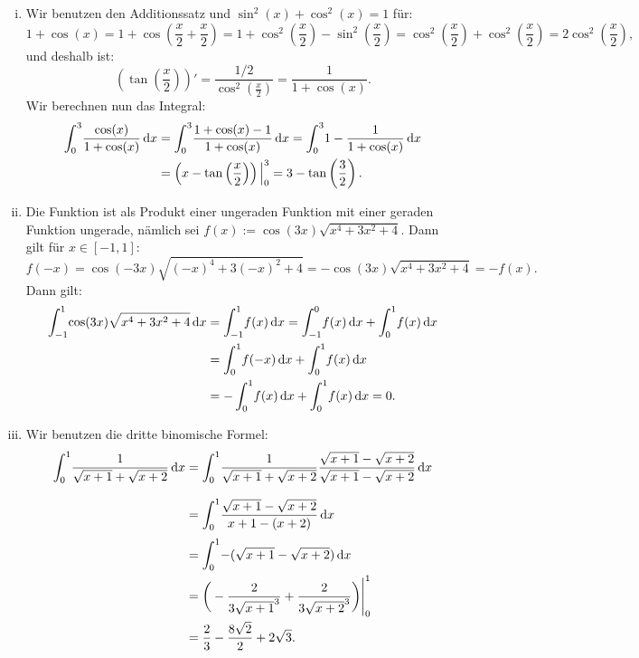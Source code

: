 \documentclass[a4paper, 20]{exam}
\begin{document}
\begin{solution}
\begin{enumerate}[i.)]
\item
Wir benutzen den Additionssatz und $\sin^2(x)+\cos^2(x)=1$ für:
$$1+\cos(x) = 1+\cos\left(\frac{x}{2}+\frac{x}{2}\right) = 1+\cos^2\left(\frac{x}{2} \right) - \sin^2\left(\frac{x}{2} \right)= \cos^2\left(\frac{x}{2} \right)+\cos^2\left(\frac{x}{2} \right) = 2\cos^2\left(\frac{x}{2} \right),$$
und deshalb ist:
$$\left(\tan\left(\frac{x}{2} \right) \right)' = \frac{1/2}{\cos^2\left(\frac{x}{2} \right)} = \frac{1}{1+\cos(x)}.$$
Wir berechnen nun das Integral:
\begin{equation}
\begin{aligned}
\int_0^3 \! \frac{\cos(x)}{1+\cos(x)} \, \mathrm{d}x 
&=\int_0^3 \! \frac{1+\cos(x)-1}{1+\cos(x)} \, \mathrm{d}x 
= \int_0^3 \! 1-\frac{1}{1+\cos(x)} \, \mathrm{d}x\\
&= \left( x-\tan\left(\frac{x}{2}\right) \right)\Big|^3_0
=3-\tan\left(\frac{3}{2}\right). 
\notag
\end{aligned}
\end{equation}

\item
Die Funktion ist als Produkt einer ungeraden Funktion mit einer geraden Funktion ungerade, nämlich sei $f(x):={\cos(3x)}\sqrt{x^4+3x^2+4}$. Dann gilt für $x \in [-1,1]$:
$$f(-x)={\cos(-3x)}\sqrt{(-x)^4+3(-x)^2+4} = -{\cos(3x)}\sqrt{x^4+3x^2+4} = -f(x).$$
Dann gilt:
\begin{equation}
\begin{aligned}
\int_{-1}^1 \! {\cos(3x)}\sqrt{x^4+3x^2+4} \, \mathrm{d}x
 &= \int_{-1}^1 \! f(x) \, \mathrm{d}x 
= \int_{-1}^0 \! f(x) \, \mathrm{d}x+\int_{0}^1 \! f(x) \, \mathrm{d}x\\
&=\int_{0}^1 \! f(-x) \, \mathrm{d}x+\int_{0}^1 \! f(x) \, \mathrm{d}x\\
&=-\int_{0}^1 \! f(x) \, \mathrm{d}x+\int_{0}^1 \! f(x) \, \mathrm{d}x = 0.
\notag
\end{aligned}
\end{equation}

\item
Wir benutzen die dritte binomische Formel:
\begin{equation}
\begin{aligned}
\int_0^1 \! \frac{1}{\sqrt{x+1}+ \sqrt{x+2}} \, \mathrm{d}x
&= \int_0^1 \! \frac{1}{\sqrt{x+1}+ \sqrt{x+2}}\frac{\sqrt{x+1}- \sqrt{x+2}}{\sqrt{x+1}- \sqrt{x+2}} \, \mathrm{d}x\\[.3cm]
&= \int_0^1 \! \frac{\sqrt{x+1}- \sqrt{x+2}}{x+1- (x+2)} \, \mathrm{d}x\\[.1cm]
&=\int_0^1 \! -(\sqrt{x+1}- \sqrt{x+2})\, \mathrm{d}x\\
&= \bigg( -\frac{2}{3\sqrt{x+1}^3} + \frac{2}{3\sqrt{x+2}^3} \bigg) \Bigg|^1_0\\
&= \frac{2}{3}- \frac{8\sqrt{2}}{2}+2\sqrt{3}. 
\notag
\end{aligned}
\end{equation}


\end{enumerate}
\end{solution}
\end{document}
